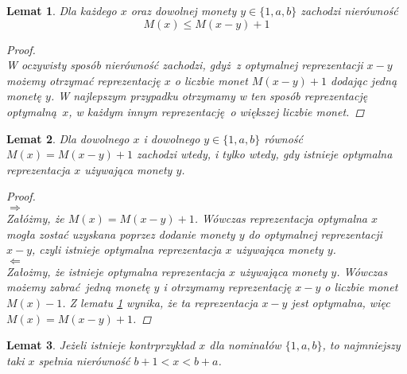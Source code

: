 \documentclass[12pt]{article}
\newtheorem{lemma}{Lemat}
\begin{document}
\begin{titlepage}
\begin{lemma}\label{lm0}\normalfont
Dla każdego $x$ oraz dowolnej monety $y \in \{1, a, b\}$ zachodzi nierówność
$$M(x) \leq M(x-y) + 1$$
\begin{proof}$ $\\
W oczywisty sposób nierówność zachodzi, gdyż z optymalnej reprezentacji
$x-y$ możemy otrzymać reprezentację $x$ o liczbie monet $M(x-y)+1$ dodając
jedną monetę $y$. W najlepszym przypadku otrzymamy w ten sposób reprezentację
optymalną $x$, w każdym innym reprezentację o większej liczbie monet.
\end{proof}
\end{lemma}

\begin{lemma}\label{lm01}\normalfont
Dla dowolnego $x$ i dowolnego $y \in \{1, a, b\}$ równość
$M(x) = M(x-y) + 1$ zachodzi wtedy, i tylko wtedy, gdy
istnieje optymalna reprezentacja $x$ używająca monety $y$.

\begin{proof}$ $\\
$\Rightarrow$\\
Załóżmy, że $M(x) = M(x-y) + 1$. Wówczas reprezentacja optymalna $x$ mogła
zostać uzyskana poprzez dodanie monety $y$ do optymalnej reprezentacji $x-y$,
czyli istnieje optymalna reprezentacja $x$ używająca monety $y$.\\
$\Leftarrow$\\
Założmy, że istnieje optymalna reprezentacja $x$ używająca monety $y$. Wówczas
możemy zabrać jedną monetę $y$ i otrzymamy reprezentację $x-y$ o liczbie monet
$M(x) - 1$. Z lematu \ref{lm0} wynika, że ta reprezentacja $x-y$ jest optymalna,
więc $M(x) = M(x-y) + 1$.
\end{proof}
\end{lemma}

\begin{lemma}\label{lm1}
\normalfont
Jeżeli istnieje kontrprzykład $x$ dla nominałów $\{1, a, b\}$, to najmniejszy
taki $x$ spełnia nierówność $b + 1 < x < b + a$.


\end{lemma}
\end{titlepage}
\end{document}
